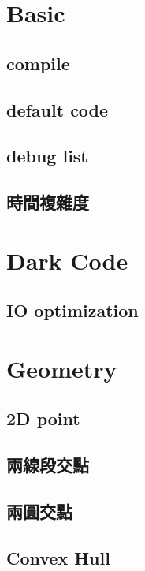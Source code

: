 \section{Basic}

\subsection{compile}

\subsection{default code}

\subsection{debug list}

\subsection{時間複雜度}


\section{Dark Code}

\subsection{IO optimization}


\section{Geometry}

\subsection{2D point}

\subsection{兩線段交點}

\subsection{兩圓交點}

\subsection{Convex Hull}


